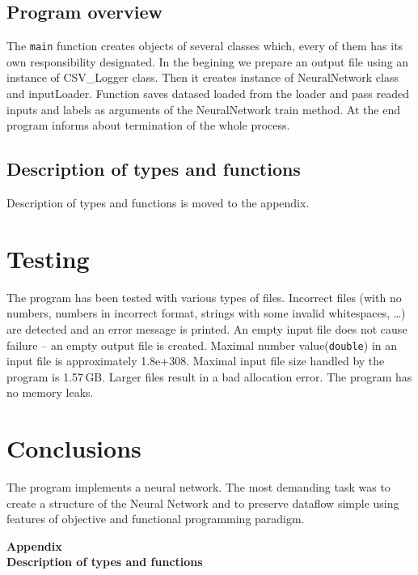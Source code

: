 \documentclass[12pt,a4paper,twoside]{article}
\let\oldmarginpar\marginpar
\renewcommand\marginpar[1]{%
  {\linespread{0.85}\normalfont\scriptsize%
\oldmarginpar[\hspace{1cm}\begin{minipage}{3cm}\raggedleft\scriptsize\color{black}\textsf{#1}\end{minipage}]%
{\hspace{0cm}\begin{minipage}{3cm}\raggedright\scriptsize\color{black}\textsf{#1}\end{minipage}}%
}%
}
\begin{document}
\subsection{Program overview}
The \lstinline|main| function creates objects of several classes which, every of them has its own responsibility designated. In the begining we prepare an output file using an instance of CSV\_Logger class. Then it creates instance of NeuralNetwork class and inputLoader. Function saves datased loaded from the loader and pass readed inputs and labels as arguments of the NeuralNetwork train method. At the end program informs about termination of the whole process.

\subsection{Description of types and functions}
Description of types and functions is moved to the appendix.



\section{Testing}
The program has been tested with various types of files. Incorrect files (with no numbers, numbers in incorrect format, strings with some invalid whitespaces, \ldots) are detected and an error message is printed. An empty input file does not cause failure – an empty output file is created. Maximal number value(\lstinline!double!) in an input file is approximately 1.8e+308. Maximal input file size handled by the program is \mbox{1.57$\,$GB}. Larger files result in a bad allocation error. The program has no memory leaks.



\section{Conclusions}

The program implements a neural network. The most demanding task was to create a structure of the Neural Network and to preserve dataflow simple using features of objective and functional programming paradigm.







\cleardoublepage

\rule{0cm}{0cm}

\vfill

\begin{center}
   \Huge\bfseries Appendix\\Description of types and functions\par
\end{center}

\vfill

\rule{0cm}{0cm}
\end{document}
